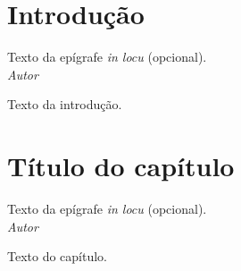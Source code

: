 \documentclass[a4paper,12pt,oneside,onecolumn,final,fleqn]{repUERJ}
\begin{document}
\chapter*{Introdução}

\begin{epigrafeonline}
\hfill Texto da epígrafe \textit{in locu} (opcional).\\
\hspace*{\fill}\textit{Autor}\\
\end{epigrafeonline}

Texto da introdução.

\nocite{bib:ABNT2011}

\nocite{bib:livro}

\nocite{bib:ebook}

\nocite{bib:tese}

\nocite{bib:dissertacao}

\nocite{bib:monografia}

\nocite{bib:TCC}

\nocite{bib:artigo}

\nocite{bib:proceedings}

\nocite{bib:inproceedings}

\nocite{bib:relatorio}

\nocite{bib:software}

\nocite{bib:software1}

\nocite{bib:inbook}

\nocite{bib:incollection}


\chapter{T\'itulo do cap\'itulo}

\begin{epigrafeonline}
\hfill Texto da epígrafe \textit{in locu} (opcional).\\
\hspace*{\fill}\textit{Autor}\\
\end{epigrafeonline}

Texto do capítulo.

\end{document}
